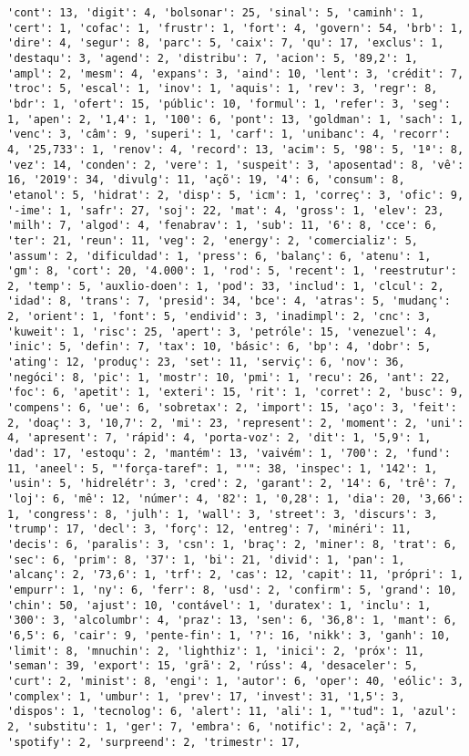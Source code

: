 \documentclass[11pt]{article}
\begin{document}
\begin{Verbatim}[commandchars=\\\{\}]
'cont': 13, 'digit': 4, 'bolsonar': 25, 'sinal': 5, 'caminh': 1, 'cert': 1, 'cofac': 1, 'frustr': 1, 'fort': 4, 'govern': 54, 'brb': 1, 'dire': 4, 'segur': 8, 'parc': 5, 'caix': 7, 'qu': 17, 'exclus': 1, 'destaqu': 3, 'agend': 2, 'distribu': 7, 'acion': 5, '89,2': 1, 'ampl': 2, 'mesm': 4, 'expans': 3, 'aind': 10, 'lent': 3, 'crédit': 7, 'troc': 5, 'escal': 1, 'inov': 1, 'aquis': 1, 'rev': 3, 'regr': 8, 'bdr': 1, 'ofert': 15, 'públic': 10, 'formul': 1, 'refer': 3, 'seg': 1, 'apen': 2, '1,4': 1, '100': 6, 'pont': 13, 'goldman': 1, 'sach': 1, 'venc': 3, 'câm': 9, 'superi': 1, 'carf': 1, 'unibanc': 4, 'recorr': 4, '25,733': 1, 'renov': 4, 'record': 13, 'acim': 5, '98': 5, '1ª': 8, 'vez': 14, 'conden': 2, 'vere': 1, 'suspeit': 3, 'aposentad': 8, 'vê': 16, '2019': 34, 'divulg': 11, 'açõ': 19, '4': 6, 'consum': 8, 'etanol': 5, 'hidrat': 2, 'disp': 5, 'icm': 1, 'correç': 3, 'ofic': 9, '-ime': 1, 'safr': 27, 'soj': 22, 'mat': 4, 'gross': 1, 'elev': 23, 'milh': 7, 'algod': 4, 'fenabrav': 1, 'sub': 11, '6': 8, 'cce': 6, 'ter': 21, 'reun': 11, 'veg': 2, 'energy': 2, 'comercializ': 5, 'assum': 2, 'dificuldad': 1, 'press': 6, 'balanç': 6, 'atenu': 1, 'gm': 8, 'cort': 20, '4.000': 1, 'rod': 5, 'recent': 1, 'reestrutur': 2, 'temp': 5, 'auxlio-doen': 1, 'pod': 33, 'includ': 1, 'clcul': 2, 'idad': 8, 'trans': 7, 'presid': 34, 'bce': 4, 'atras': 5, 'mudanç': 2, 'orient': 1, 'font': 5, 'endivid': 3, 'inadimpl': 2, 'cnc': 3, 'kuweit': 1, 'risc': 25, 'apert': 3, 'petróle': 15, 'venezuel': 4, 'inic': 5, 'defin': 7, 'tax': 10, 'básic': 6, 'bp': 4, 'dobr': 5, 'ating': 12, 'produç': 23, 'set': 11, 'serviç': 6, 'nov': 36, 'negóci': 8, 'pic': 1, 'mostr': 10, 'pmi': 1, 'recu': 26, 'ant': 22, 'foc': 6, 'apetit': 1, 'exteri': 15, 'rit': 1, 'corret': 2, 'busc': 9, 'compens': 6, 'ue': 6, 'sobretax': 2, 'import': 15, 'aço': 3, 'feit': 2, 'doaç': 3, '10,7': 2, 'mi': 23, 'represent': 2, 'moment': 2, 'uni': 4, 'apresent': 7, 'rápid': 4, 'porta-voz': 2, 'dit': 1, '5,9': 1, 'dad': 17, 'estoqu': 2, 'mantém': 13, 'vaivém': 1, '700': 2, 'fund': 11, 'aneel': 5, "'força-taref": 1, "'": 38, 'inspec': 1, '142': 1, 'usin': 5, 'hidrelétr': 3, 'cred': 2, 'garant': 2, '14': 6, 'trê': 7, 'loj': 6, 'mê': 12, 'númer': 4, '82': 1, '0,28': 1, 'dia': 20, '3,66': 1, 'congress': 8, 'julh': 1, 'wall': 3, 'street': 3, 'discurs': 3, 'trump': 17, 'decl': 3, 'forç': 12, 'entreg': 7, 'minéri': 11, 'decis': 6, 'paralis': 3, 'csn': 1, 'braç': 2, 'miner': 8, 'trat': 6, 'sec': 6, 'prim': 8, '37': 1, 'bi': 21, 'divid': 1, 'pan': 1, 'alcanç': 2, '73,6': 1, 'trf': 2, 'cas': 12, 'capit': 11, 'própri': 1, 'empurr': 1, 'ny': 6, 'ferr': 8, 'usd': 2, 'confirm': 5, 'grand': 10, 'chin': 50, 'ajust': 10, 'contável': 1, 'duratex': 1, 'inclu': 1, '300': 3, 'alcolumbr': 4, 'praz': 13, 'sen': 6, '36,8': 1, 'mant': 6, '6,5': 6, 'cair': 9, 'pente-fin': 1, '?': 16, 'nikk': 3, 'ganh': 10, 'limit': 8, 'mnuchin': 2, 'lighthiz': 1, 'inici': 2, 'próx': 11, 'seman': 39, 'export': 15, 'grã': 2, 'rúss': 4, 'desaceler': 5, 'curt': 2, 'minist': 8, 'engi': 1, 'autor': 6, 'oper': 40, 'eólic': 3, 'complex': 1, 'umbur': 1, 'prev': 17, 'invest': 31, '1,5': 3, 'dispos': 1, 'tecnolog': 6, 'alert': 11, 'ali': 1, "'tud": 1, 'azul': 2, 'substitu': 1, 'ger': 7, 'embra': 6, 'notific': 2, 'açã': 7, 'spotify': 2, 'surpreend': 2, 'trimestr': 17, 
\end{Verbatim}
\end{document}

